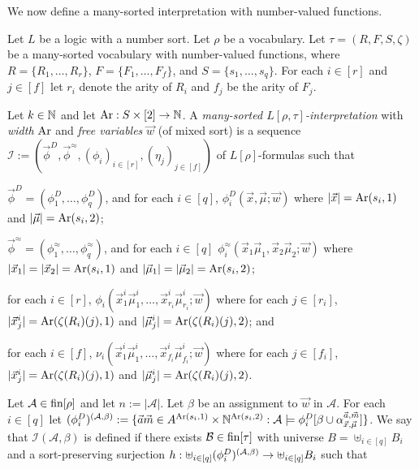 \documentclass[../main/thesis.tex]{subfiles}
\begin{document}
We now define a many-sorted interpretation with number-valued functions.

\begin{definition}
  Let $L$ be a logic with a number sort. Let $\rho$ be a vocabulary. Let $\tau =
  (R, F, S, \zeta)$ be a many-sorted vocabulary with number-valued functions,
  where $R = \{R_1, \ldots, R_{r}\}$, $F = \{ F_1, \ldots, F_{f} \}$, and $S =
  \{s_1, \ldots, s_{q}\}$. For each $i \in [r]$ and $j \in [f]$ let $r_i$ denote
  the arity of $R_i$ and $f_j$ be the arity of $F_j$.

  Let $k \in \mathbb{N}$ and let $\text{\upshape Ar} : S \times [2] \rightarrow \mathbb{N}$. A \emph{many-sorted
    $L [\rho, \tau]$-interpretation} with \emph{width} $\text{\upshape Ar}$ and \emph{free
    variables} $\vec{w}$ (of mixed sort) is a sequence $\mathcal{I} :=
  (\vec{\phi}^D, \vec{\phi}^{\approx}, (\phi_i)_{i \in [r]}, (\eta_j)_{j \in
    [f]})$ of $L[\rho]$-formulas such that
  \begin{myenum}
  \item $\vec{\phi}^D = (\phi^D_1, \ldots, \phi^D_q)$, and for each $i \in [q]$,
    $\phi^D_i(\vec{x}, \vec{\mu}; \vec{w})$ where $\vert \vec{x} \vert =
    \text{\upshape Ar}(s_i, 1)$ and $\vert \vec{\mu} \vert = \text{\upshape Ar}(s_i, 2)$;
  \item $\vec{\phi}^{\approx} = (\phi^{\approx}_1, \ldots, \phi^{\approx}_q)$,
    and for each $i \in [q]$ $\phi^{\approx}_i(\vec{x}_1\vec{\mu}_1, \vec{x}_2
    \vec{\mu}_2 ; \vec{w})$ where $\vert \vec{x}_1 \vert = \vert \vec{x}_2 \vert
    = \text{\upshape Ar}(s_i, 1)$ and $\vert \vec{\mu}_1 \vert = \vert \vec{\mu}_2 \vert =
    \text{\upshape Ar}(s_i, 2)$;
  \item for each $i \in [r]$, $\phi_i (\vec{x}^i_1 \vec{\mu}^i_1, \ldots,
    \vec{x}^{i}_{r_i} \vec{\mu}^{i}_{r_i} ; \vec{w})$ where for each $j \in
    [r_i]$, $\vert \vec{x}^i_j\vert = \text{\upshape Ar}(\zeta(R_i)(j), 1)$ and $\vert
    \vec{\mu}^i_j \vert = \text{\upshape Ar}(\zeta(R_i)(j), 2)$; and
  \item for each $i \in [f]$, $\nu_i (\vec{x}^i_1 \vec{\mu}^i_1, \ldots,
    \vec{x}^{i}_{f_i} \vec{\mu}^{i}_{f_i} ; \vec{w})$ where for each $j \in
    [f_i]$, $\vert \vec{x}^i_j \vert = \text{\upshape Ar}(\zeta(R_i)(j), 1)$ and $\vert
    \vec{\mu}^i_j \vert = \text{\upshape Ar}(\zeta(R_i)(j), 2)$.
  \end{myenum}

  Let $\mathcal{A} \in \text{\upshape fin}{[\rho]}$ and let $n := \vert \mathcal{A} \vert$. Let
  $\beta$ be an assignment to $\vec{w}$ in $\mathcal{A}$. For each $i \in [q]$
  let $(\phi^D_i)^{(\mathcal{A}, \beta)} := \{ \vec{a}\vec{m} \in A^{\text{\upshape Ar}(s_i,
    1)} \times \mathbb{N}^{\text{\upshape Ar}(s_i, 2)}: \mathcal{A} \models \phi^D_i[\beta \cup
  \alpha^{\vec{a}, \vec{m}}_{\vec{x}, \vec{\mu}}] \}$. We say that $\mathcal{I}
  (\mathcal{A}, \beta)$ is defined if there exists $\mathcal{B} \in \text{\upshape fin}{[\tau]}$
  with universe $B = \uplus_{i \in [q]} B_i$ and a sort-preserving surjection $h
  : \uplus_{i \in [q]} (\phi^D_i)^{(\mathcal{A}, \beta)} \rightarrow \uplus_{i \in [q]}
  B_i$ such that
    

\end{definition}
\end{document}
